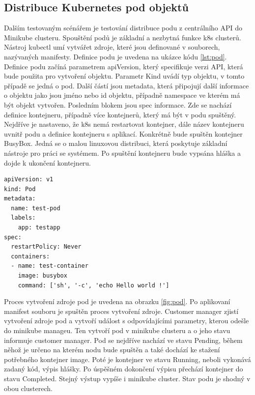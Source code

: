 \subsection{Distribuce Kubernetes pod objektů}
    Dalším testovaným scénářem je testování distribuce podu z centrálního API \linebreak do Minikube clusteru. Spouštění podů je základní a nezbytná funkce k8s clusterů. Nástroj kubectl umí vytvářet zdroje, které jsou definované v souborech, nazývaných manifesty. Definice podu je uvedena na ukázce kódu \ref{lst:pod}. Definice podu začíná parametrem apiVersion, který specifikuje verzi API, která bude použita pro vytvoření objektu. Parametr Kind uvádí typ objektu, v tomto případě se jedná o pod. Další částí jsou metadata, která připojují další informace o objektu jako jsou jméno nebo id objektu, případně namespace ve kterém má být objekt vytvořen. Posledním blokem jsou spec informace. Zde se nachází definice kontejneru, případně více kontejnerů, který má být v podu spuštěný. Nejdříve je nastaveno, že k8s nemá restartovat kontejner, dále název kontejneru uvnitř podu a definice kontejneru s aplikací. Konkrétně bude spuštěn kontejner BusyBox. Jedná se o malou linuxovou distribuci, která poskytuje základní nástroje pro práci se systémem. Po spuštění kontejneru bude vypsána hláška a dojde k ukončení kontejneru.
\begin{lstlisting}[caption={pod.yml, definice podu},label=lst:pod]
apiVersion: v1
kind: Pod
metadata:
  name: test-pod
  labels:
    app: testapp
spec:
  restartPolicy: Never
  containers:
  - name: test-container
    image: busybox
    command: ['sh', '-c', 'echo Hello world !']
\end{lstlisting}
			  Proces vytvoření zdroje pod je uvedena na obrazku \ref{fig:pod}. Po aplikovaní manifest souboru je spuštěn proces vytvoření zdroje. Customer manager zjistí vytvoření zdroje pod a vytvoří událost s odpovídajícími parametry, kterou odešle do minikube manageu. Ten vytvoří pod v minikube clusteru a o jeho stavu informuje customer manager. Pod se nejdříve nachází ve stavu Pending, během něhož je určeno na kterém nodu bude spuštěn a také dochází ke stažení potřebného kontejner image. Poté je kontejner \linebreak ve stavu Running, neboli vykonává zadaný kód, výpis hlášky. Po úspěšném dokončení výpisu přechází kontejner do stavu Completed. Stejný výstup vypíše i minikube cluster. Stav podu je shodný v obou clusterech.
